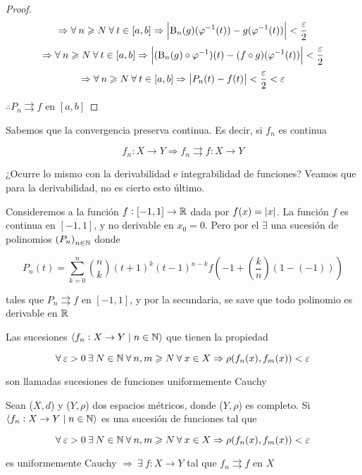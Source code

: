 \begin{proof}
    $$\Rightarrow \forall \: n \geqslant N \: \forall \: t \in [a,b] \Rightarrow \abs{\mathrm{B}_n(g)({\varphi}^{-1} (t)) -g({\varphi}^{-1} (t) )} < \frac{\varepsilon}{2}$$
    $$\Rightarrow \forall \: n \geqslant N \: \forall \: t \in [a,b] \Rightarrow \abs{(\mathrm{B}_n(g) \circ {\varphi}^{-1}) (t) -(f \circ g)({\varphi}^{-1} (t) )} < \frac{\varepsilon}{2}$$
    $$\Rightarrow \forall \: n \geqslant N \: \forall \: t \in [a,b] \Rightarrow \abs{P_n(t) - f(t)} < \frac{\varepsilon}{2} < \varepsilon$$

    $\therefore P_n \rightrightarrows f$ en $[a,b]$
\end{proof}

\begin{remark}
    Sabemos que la convergencia preserva continua. Es decir, si $f_n$ es continua

    $$f_n : X \to Y \Rightarrow f_n \rightrightarrows f : X \to Y$$

    ¿Ocurre lo mismo con la derivabilidad e integrabilidad de funciones? Veamos que para la derivabilidad, no es cierto esto último.
 \end{remark}

 \begin{eg}
     Consideremos a la función $f : [-1, 1] \to \mathbb{R}$ dada por $f(x) = \abs{x}$. La función $f$ es continua en $[-1, 1]$, y no derivable en $x_0 = 0$. Pero por el  $\exists$ una sucesión de polinomios ${\left(P_n\right)}_{n \in \mathbb{N}}$ donde 

     $$P_n(t) = \sum_{k=0}^{n} \binom{n}{k} {(t+1)}^{k}{(t-1)}^{n-k} f \left( -1 + \left(\frac{k}{n} \right)(1-(-1)) \right)$$

     tales que $P_n \rightrightarrows f$ en $[-1, 1] $, y por la secundaria, se save que todo polinomio es derivable en $\mathbb{R}$
 \end{eg}

\begin{definition}  \label{def532}
    Las sucesiones $\langle f_n : X \to Y \mid n \in \mathbb{N} \rangle $ que tienen la propiedad

    $$\forall \: \varepsilon > 0 \: \exists \: N \in \mathbb{N} \: \forall \: n, m \geqslant N \: \forall \: x \in X \Rightarrow \rho(f_n(x),f_m(x)) < \varepsilon$$

    son llamadas sucesiones de funciones uniformemente Cauchy
\end{definition}

 \begin{theorem} \label{theom533}
     Sean ($X,d$) y ($Y,\rho$) dos espacios métricos, donde ($Y,\rho$) es completo. Si $\langle f_n : X \to Y \mid n \in \mathbb{N} \rangle $ es una sucesión de funciones tal que

     $$\forall \: \varepsilon > 0 \: \exists \: N \in \mathbb{N} \: \forall \: n, m \geqslant N \: \forall \: x \in X \Rightarrow \rho(f_n(x),f_m(x)) < \varepsilon$$

     es uniformemente Cauchy $\Rightarrow \: \exists \: f : X \to Y$ tal que $f_n \rightrightarrows f$ en $X$
 \end{theorem}

